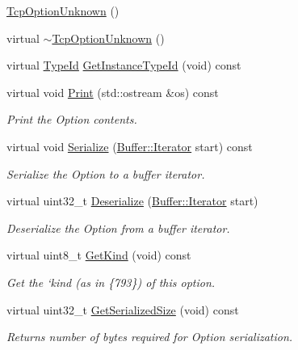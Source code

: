 \begin{DoxyCompactItemize}
\item 
\hyperlink{classns3_1_1TcpOptionUnknown_a129e3b4d6cc884eb5bc3437e6bafc04b}{Tcp\+Option\+Unknown} ()
\item 
virtual \hyperlink{classns3_1_1TcpOptionUnknown_a53e06396bf1a4d68bcb1434f510b2e67}{$\sim$\+Tcp\+Option\+Unknown} ()
\item 
virtual \hyperlink{classns3_1_1TypeId}{Type\+Id} \hyperlink{classns3_1_1TcpOptionUnknown_a2f925f391a92474f0e3b4fd3ae29dadf}{Get\+Instance\+Type\+Id} (void) const 
\item 
virtual void \hyperlink{classns3_1_1TcpOptionUnknown_a9cb9c9a0da67b733b031d645d972ee72}{Print} (std\+::ostream \&os) const 
\begin{DoxyCompactList}\small\item\em Print the Option contents. \end{DoxyCompactList}\item 
virtual void \hyperlink{classns3_1_1TcpOptionUnknown_af7aabfed964607f8a37cfc381bfa3fbd}{Serialize} (\hyperlink{classns3_1_1Buffer_1_1Iterator}{Buffer\+::\+Iterator} start) const 
\begin{DoxyCompactList}\small\item\em Serialize the Option to a buffer iterator. \end{DoxyCompactList}\item 
virtual uint32\+\_\+t \hyperlink{classns3_1_1TcpOptionUnknown_ae6343958a6ce72ed9133677d1b43866b}{Deserialize} (\hyperlink{classns3_1_1Buffer_1_1Iterator}{Buffer\+::\+Iterator} start)
\begin{DoxyCompactList}\small\item\em Deserialize the Option from a buffer iterator. \end{DoxyCompactList}\item 
virtual uint8\+\_\+t \hyperlink{classns3_1_1TcpOptionUnknown_a35734dbfe28156afa486df2ceaeaaa0b}{Get\+Kind} (void) const 
\begin{DoxyCompactList}\small\item\em Get the `kind\textquotesingle{} (as in \{793\}) of this option. \end{DoxyCompactList}\item 
virtual uint32\+\_\+t \hyperlink{classns3_1_1TcpOptionUnknown_aeb0ac3fe471a1e3d53bf4633d2420b94}{Get\+Serialized\+Size} (void) const 
\begin{DoxyCompactList}\small\item\em Returns number of bytes required for Option serialization. \end{DoxyCompactList}\end{DoxyCompactItemize}
